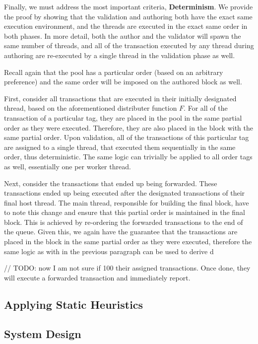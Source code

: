 Finally, we must address the most important criteria, \textbf{Determinism}. We provide the proof by
showing that the validation and authoring both have the exact same execution environment, and the
threads are executed in the exact same order in both phases. In more detail, both the author and the
validator will spawn the same number of threads, and all of the transaction executed by any thread
during authoring are re-executed by a single thread in the validation phase as well.

Recall again that the pool has a particular order (based on an arbitrary preference) and the same
order will be imposed on the authored block as well.

First, consider all transactions that are executed in their initially designated thread, based on
the aforementioned distributer function $F$. For all of the transaction of a particular tag, they
are placed in the pool in the same partial order as they were executed. Therefore, they are also
placed in the block with the same partial order. Upon validation, all of the transactions of this
particular tag are assigned to a single thread, that executed them sequentially in the same order,
thus deterministic. The same logic can trivially be applied to all order tags as well, essentially
one per worker thread.

Next, consider the transactions that ended up being forwarded. These transactions ended up being
executed after the designated transactions of their final host thread. The main thread, responsible
for building the final block, have to note this change and ensure that this partial order is
maintained in the final block. This is achieved by re-ordering the forwarded transactions to the end
of the queue. Given this, we again have the guarantee that the transactions are placed in the block
in the same partial order as they were executed, therefore the same logic as with in the previous
paragraph can be used to derive d


// TODO: now I am not sure if 100%
their assigned transactions. Once done, they will execute a forwarded transaction and immediately
report.


\subsection{Applying Static Heuristics}

\subsection{System Design}


